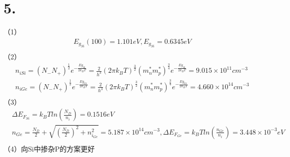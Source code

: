 \documentclass[UTF8]{ctexart}
\begin{document}
\section*{5.}
（1）
\begin{equation*}
    \begin{aligned}
        & E_{g_{Si}}(100)=1.101eV, E_{g_{Si}}=0.6345eV\\
    \end{aligned}
\end{equation*}
（2）
\begin{equation*}
    \begin{aligned}
        & n_{iSi}=(N_{-}N_{+})^{\frac{1}{2}}e^{-\frac{Eg_{Si}}{2k_BT}}=\frac{2}{h^3}(2\pi k_BT)^{\frac{3}{2}}
        (m_n^*m_p^*)^{\frac{3}{4}}e^{-\frac{Eg_{Si}}{2k_BT}}=9.015\times10^{11}cm^{-3}\\
        & n_{iGe}=(N_{-}N_{+})^{\frac{1}{2}}e^{-\frac{Eg_{Ge}}{2k_BT}}=\frac{2}{h^3}(2\pi k_BT)^{\frac{3}{2}}
        (m_n^*m_p^*)^{\frac{3}{4}}e^{-\frac{Eg_{Ge}}{2k_BT}}=4.660\times10^{14}cm^{-3}\\
    \end{aligned}
\end{equation*}
（3）
\begin{equation*}
    \begin{aligned}
        & \Delta E_{F_{Si}}=k_BTln(\frac{N_D}{n_i})=0.1516eV\\
        & n_{Ge}=\frac{N_D}{2}+\sqrt{(\frac{N_D}{2})^2+n_{i_{Ge}}^2}=5.187\times10^{14}cm^{-3}, 
        \Delta E_{F_{Ge}}=k_BTln(\frac{n_{Ge}}{n_i})=3.448\times10^{-3}eV\\
    \end{aligned}
\end{equation*}
（4）向Si中掺杂P的方案更好\\
\end{document}
